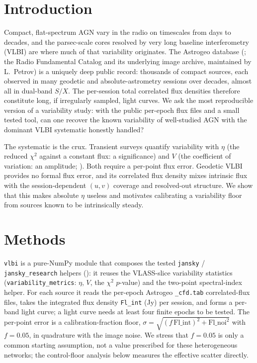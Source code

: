 \documentclass[twocolumn]{aastex631}
\newcommand{\code}[1]{\texttt{#1}}
\begin{document}
\section{Introduction}
Compact, flat-spectrum AGN vary in the radio on timescales from days to decades, and the parsec-scale
cores resolved by very long baseline interferometry (VLBI) are where much of that variability
originates. The Astrogeo database (\citealt{petrov2025}; the Radio Fundamental Catalog and its
underlying image archive, maintained by L.\ Petrov) is a uniquely deep public record: thousands of
compact sources, each observed in many geodetic and absolute-astrometry sessions over decades, almost
all in dual-band $S/X$. The per-session total correlated flux densities therefore constitute long,
if irregularly sampled, light curves. We ask the most reproducible version of a variability study: with
the public per-epoch flux files and a small tested tool, can one recover the known variability of
well-studied AGN with the dominant VLBI systematic honestly handled?

The systematic is the crux. Transient surveys quantify variability with $\eta$ (the reduced $\chi^2$
against a constant flux: a significance) and $V$ (the coefficient of variation: an amplitude;
\citealt{scheers2011,swinbank2015,rowlinson2019}). Both require a per-point flux error. Geodetic VLBI
provides no formal flux error, and its correlated flux density mixes intrinsic flux with the
session-dependent $(u,v)$ coverage and resolved-out structure. We show that this makes absolute $\eta$
useless and motivates calibrating a variability floor from sources known to be intrinsically steady.

\section{Methods}
\code{vlbi} is a pure-NumPy module that composes the tested \code{jansky} / \code{jansky\_research}
helpers (\citealt{jansky}): it reuses the VLASS-slice variability statistics (\code{variability\_metrics}:
$\eta$, $V$, the $\chi^2$ $p$-value) and the two-point spectral-index helper. For each source it reads the
per-epoch Astrogeo \code{\_cfd.tab} correlated-flux files, takes the integrated flux density
\code{Fl\_int} (Jy) per session, and forms a per-band light curve; a light curve needs at least four
finite epochs to be tested. The per-point error is a calibration-fraction floor,
$\sigma=\sqrt{(f\,\mathrm{Fl\_int})^2+\mathrm{Fl\_noi}^2}$ with $f=0.05$, in quadrature with the image
noise. We stress that $f=0.05$ is only a common starting assumption, not a value prescribed for
these heterogeneous networks; the control-floor analysis below measures the effective scatter directly.
\end{document}
